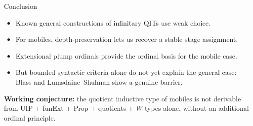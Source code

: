 \documentclass{beamer}
\begin{document}
\begin{frame}{Conclusion}
  \begin{itemize}
    \item Known general constructions of infinitary QITs use weak choice.
    \item For mobiles, depth-preservation lets us recover a stable stage
          assignment.
    \item Extensional plump ordinals provide the ordinal basis for the
          mobile case.
    \item But bounded syntactic criteria alone do not yet explain the
          general case: Blass and Lumsdaine--Shulman show a genuine barrier.
  \end{itemize}

  \medskip

  \textbf{Working conjecture:}
  the quotient inductive type of mobiles is not derivable from
  UIP + funExt + Prop + quotients + \(W\)-types alone,
  without an additional ordinal principle.

\end{frame}
\end{document}
